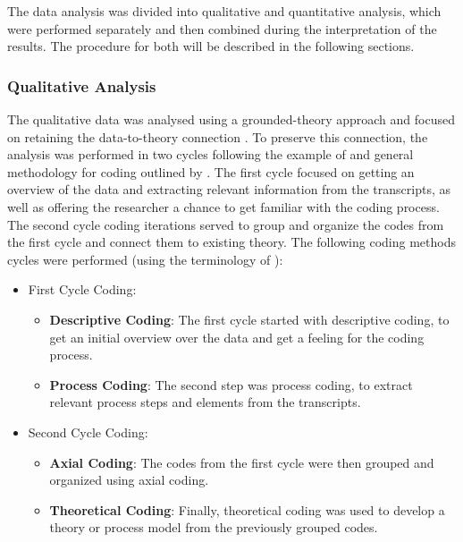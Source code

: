 The data analysis was divided into qualitative and quantitative analysis, which were performed separately and then combined during the interpretation of the results. The procedure for both will be described in the following sections.

\subsubsection{Qualitative Analysis} \label{sssec:qualitative_analysis}

The qualitative data was analysed using a grounded-theory approach and focused on retaining the data-to-theory connection \parencite{Gioia2021}. To preserve this connection, the analysis was performed in two cycles following the example of \cite{Jussupow2021} and general methodology for coding outlined by \cite{Saldana2015}. The first cycle focused on getting an overview of the data and extracting relevant information from the transcripts, as well as offering the researcher a chance to get familiar with the coding process. The second cycle coding iterations served to group and organize the codes from the first cycle and connect them to existing theory. The following coding methods cycles were performed (using the terminology of \cite{Saldana2015}):

\begin{itemize}
    \item First Cycle Coding:
    \begin{itemize}
        \item \textbf{Descriptive Coding}: The first cycle started with descriptive coding, to get an initial overview over the data and get a feeling for the coding process.
        \item \textbf{Process Coding}: The second step was process coding, to extract relevant process steps and elements from the transcripts.
    \end{itemize}
    \item Second Cycle Coding:
    \begin{itemize}
        \item \textbf{Axial Coding}: The codes from the first cycle were then grouped and organized using axial coding.
        \item \textbf{Theoretical Coding}: Finally, theoretical coding was used to develop a theory or process model from the previously grouped codes.
    \end{itemize}
\end{itemize}

